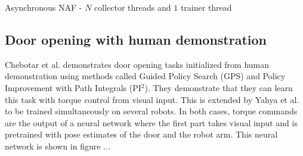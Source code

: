 \begin{algorithm}[!h]
    \caption{Asynchronous NAF - $N$ collector threads and $1$ trainer thread}
    \begin{algorithmic}
        \ENDFOR
            \ENDFOR
        \ENDFOR
    \end{algorithmic}
    \label{algo:async_naf}
\end{algorithm}

\subsection{Door opening with human demonstration}

Chebotar et al. \cite{chebotar2016path} demonstrates door opening tasks
initialized from human demonstration using methods called Guided Policy Search
(GPS) and Policy Improvement with Path Integrals (PI$^2$). They demonstrate
that they can learn this task with torque control from visual input. This is
extended by Yahya et al. \cite{yahya2016collective} to be trained
simultaneously on several robots. In both cases, torque commands are the output
of a neural network where the first part takes visual input and is pretrained
with pose estimates of the door and the robot arm. This neural network is shown
in figure ...

